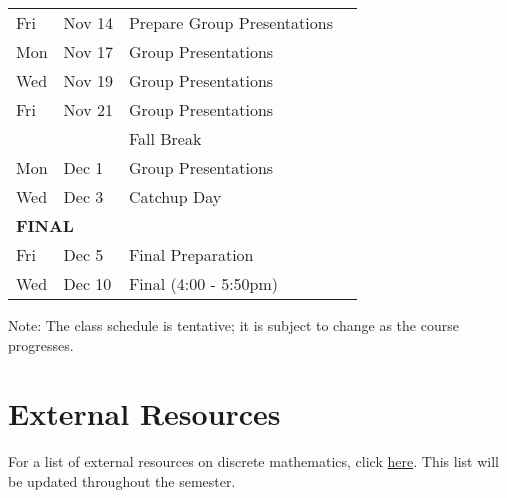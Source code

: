 \documentclass[letterpaper]{inzane_syllabus} %
\begin{document}
\begin{center}
\begin{tabularx}{\textwidth}{p{2cm}p{2cm}p{8cm}p{9.5cm}}
Fri &  Nov 14 & Prepare Group Presentations & \\
Mon &  Nov 17 & Group Presentations & \\
Wed &  Nov 19 & Group Presentations & \\
Fri &  Nov 21  & Group Presentations  & \\
 & & Fall Break & \\
Mon &  Dec 1 & Group Presentations & \\
Wed & Dec 3 & Catchup Day & \\
\hline
\multicolumn{4}{l}{\textbf{\textcolor{myCOLOR}{\large FINAL}}} \\
\hline
Fri & Dec 5 &  Final Preparation  &\\
Wed & Dec 10 & Final (4:00 - 5:50pm) & \\
\hline
%
\hline 
\end{tabularx}
Note: The class schedule is tentative; it is subject to change as the course progresses.
\end{center}

\vspace{1cm}
\section{External Resources}

For a list of external resources on discrete mathematics, click  \href{https://github.com/mikewojnowicz/csci246_fall2025/blob/main/LINKS.md}{here}.  This list will be updated throughout the semester.

\vspace{0.4cm}


\end{document}
